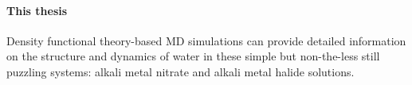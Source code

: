 

%

\paragraph{This thesis}
%
Density functional theory-based MD simulations 
can provide detailed information on the structure and dynamics  
of water in these simple but non-the-less still puzzling systems: alkali metal nitrate and alkali metal halide solutions\cite{Mizoguchi1998}.

